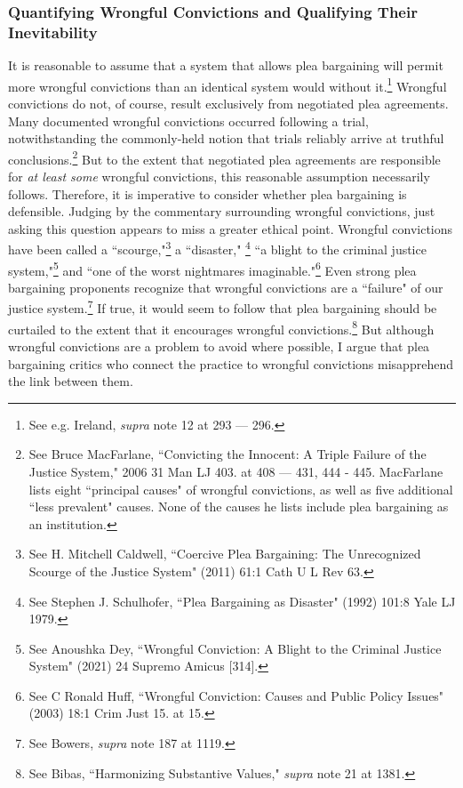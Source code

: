 \subsubsection{Quantifying Wrongful Convictions and Qualifying Their Inevitability}

It is reasonable to assume that a system that allows plea bargaining will permit more wrongful convictions than an identical system would without it.\footnote{See e.g. Ireland, \textit{supra} note 12 at 293 — 296.} Wrongful convictions do not, of course, result exclusively from negotiated plea agreements. Many documented wrongful convictions occurred following a trial, notwithstanding the commonly-held notion that trials reliably arrive at truthful conclusions.\footnote{See Bruce MacFarlane, ``Convicting the Innocent: A Triple Failure of the Justice System," 2006 31 Man LJ 403. at 408 — 431, 444 - 445. MacFarlane lists eight ``principal causes" of wrongful convictions, as well as five additional ``less prevalent" causes. None of the causes he lists include plea bargaining as an institution.} But to the extent that negotiated plea agreements are responsible for \textit{at least some} wrongful convictions, this reasonable assumption necessarily follows. Therefore, it is imperative to consider whether plea bargaining is defensible. Judging by the commentary surrounding wrongful convictions, just asking this question appears to miss a greater ethical point. Wrongful convictions have been called a ``scourge,"\footnote{See H. Mitchell Caldwell, ``Coercive Plea Bargaining: The Unrecognized Scourge of the Justice System" (2011) 61:1 Cath U L Rev 63.} a ``disaster," \footnote{See Stephen J. Schulhofer, ``Plea Bargaining as Disaster" (1992) 101:8 Yale LJ 1979.} ``a blight to the criminal justice system,"\footnote{See Anoushka Dey, ``Wrongful Conviction: A Blight to the Criminal Justice System" (2021) 24 Supremo Amicus [314].} and ``one of the worst nightmares imaginable."\footnote{See C Ronald Huff, ``Wrongful Conviction: Causes and Public Policy Issues" (2003) 18:1 Crim Just 15. at 15.} Even strong plea bargaining proponents recognize that wrongful convictions are a ``failure" of our justice system.\footnote{See Bowers, \textit{supra} note 187 at 1119.} If true, it would seem to follow that plea bargaining should be curtailed to the extent that it encourages wrongful convictions.\footnote{See Bibas, ``Harmonizing Substantive Values," \textit{supra} note 21 at 1381.} But although wrongful convictions are a problem to avoid where possible, I argue that plea bargaining critics who connect the practice to wrongful convictions misapprehend the link between them.

